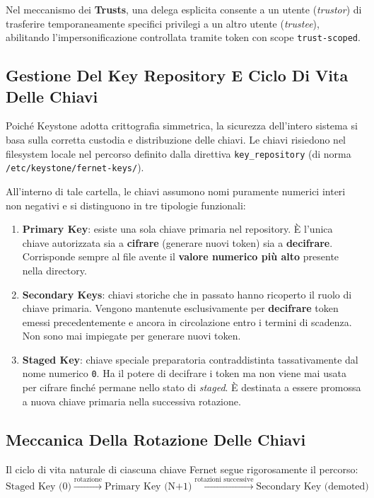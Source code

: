 \documentclass[11pt, a4paper]{article}
\begin{document}
Nel meccanismo dei \textbf{Trusts}, una delega esplicita consente a un utente (\emph{trustor}) di trasferire temporaneamente specifici privilegi a un altro utente (\emph{trustee}), abilitando l'impersonificazione controllata tramite token con scope \texttt{trust-scoped}.

\subsection{Gestione Del Key Repository E Ciclo Di Vita Delle Chiavi}

Poiché Keystone adotta crittografia simmetrica, la sicurezza dell'intero sistema si basa sulla corretta custodia e distribuzione delle chiavi. Le chiavi risiedono nel filesystem locale nel percorso definito dalla direttiva \texttt{key\_repository} (di norma \texttt{/etc/keystone/fernet-keys/}).

All'interno di tale cartella, le chiavi assumono nomi puramente numerici interi non negativi e si distinguono in tre tipologie funzionali:

\begin{enumerate}
    \item \textbf{Primary Key}: esiste una sola chiave primaria nel repository. È l'unica chiave autorizzata sia a \textbf{cifrare} (generare nuovi token) sia a \textbf{decifrare}. Corrisponde sempre al file avente il \textbf{valore numerico più alto} presente nella directory.
    \item \textbf{Secondary Keys}: chiavi storiche che in passato hanno ricoperto il ruolo di chiave primaria. Vengono mantenute esclusivamente per \textbf{decifrare} token emessi precedentemente e ancora in circolazione entro i termini di scadenza. Non sono mai impiegate per generare nuovi token.
    \item \textbf{Staged Key}: chiave speciale preparatoria contraddistinta tassativamente dal nome numerico \texttt{0}. Ha il potere di decifrare i token ma non viene mai usata per cifrare finché permane nello stato di \emph{staged}. È destinata a essere promossa a nuova chiave primaria nella successiva rotazione.
\end{enumerate}

\subsection{Meccanica Della Rotazione Delle Chiavi}

Il ciclo di vita naturale di ciascuna chiave Fernet segue rigorosamente il percorso:
\[
\text{Staged Key (0)} \xrightarrow{\text{rotazione}} \text{Primary Key (N+1)} \xrightarrow{\text{rotazioni successive}} \text{Secondary Key (demoted)}
\]
\end{document}
